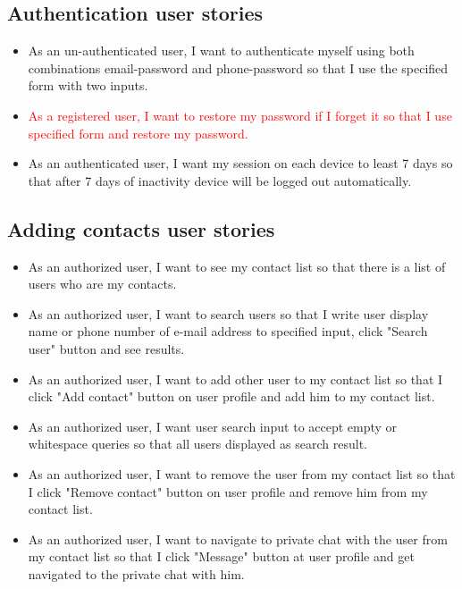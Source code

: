\subsection{Authentication user stories}\label{subsec:authentication-user-stories}
\begin{itemize}
    \item As an un-authenticated user, I want to authenticate myself using both combinations email-password and phone-password so that I use the specified form with two inputs.
    \item \textcolor{red}{As a registered user, I want to restore my password if I forget it so that I use specified form and restore my password.}
    \item As an authenticated user, I want my session on each device to least 7 days so that after 7 days of inactivity device will be logged out automatically.
\end{itemize}

\subsection{Adding contacts user stories}\label{subsec:adding-contacts}
\begin{itemize}
    \item As an authorized user, I want to see my contact list so that there is a list of users who are my contacts.
    \item As an authorized user, I want to search users so that I write user display name or phone number of e-mail address to specified input, click "Search user" button and see results.
    \item As an authorized user, I want to add other user to my contact list so that I click "Add contact" button on user profile and add him to my contact list.
    \item As an authorized user, I want user search input to accept empty or whitespace queries so that all users displayed as search result.
    \item As an authorized user, I want to remove the user from my contact list so that I click "Remove contact" button on user profile and remove him from my contact list.
    \item As an authorized user, I want to navigate to private chat with the user from my contact list so that I click "Message" button at user profile and get navigated to the private chat with him.
\end{itemize}

